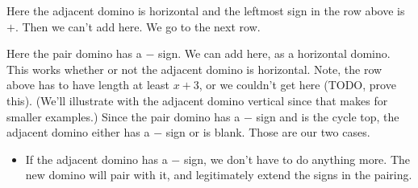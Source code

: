 \documentclass[12pt]{article}
\numberwithin{equation}{section}
\newcommand{\horizontalDominoMaybe}[3]{\filldraw [dominoMaybeStyle] (#2 - 1 + \eps, #1 - 1 + \eps) rectangle + (2 - \teps, 1 -\teps) node [dominoText] {$#3$};}
\newcommand{\greenCircle}[2]{\filldraw[green] (#2 - .5, #1 - .5) circle (.2cm);}
\begin{document}
  \begin{itemize}
    \item Here the adjacent domino is horizontal and the leftmost sign in the row above is $+$.
    Then we can't add here.
    We go to the next row.
    \begin{figure}[H]
      \centering
      \item
    \end{figure}
    \item Here the pair domino has a $-$ sign.
    We can add here, as a horizontal domino.
    This works whether or not the adjacent domino is horizontal.
    Note, the row above has to have length at least $x + 3$, or we couldn't get here (TODO, prove this).
    (We'll illustrate with the adjacent domino vertical since that makes for smaller examples.)
    Since the pair domino has a $-$ sign and is the cycle top, the adjacent domino either has a $-$ sign or is blank.  Those are our two cases.
    \begin{itemize}
      \item If the adjacent domino has a $-$ sign, we don't have to do anything more.
      The new domino will pair with it, and legitimately extend the signs in the pairing.
      \begin{figure}[H]
        \centering
\end{figure}
\end{itemize}
\end{itemize}
\end{document}

